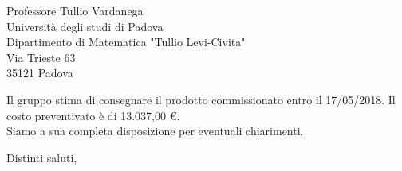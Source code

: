 \documentclass[12pt]{letter} %
\begin{document}
\begin{letter}{Professore Tullio Vardanega \\ Università degli studi di Padova \\ Dipartimento di Matematica "Tullio Levi-Civita" \\ Via Trieste 63 \\ 35121 Padova}
\begin{addmargin}[2em]{2em}
  Il gruppo stima di consegnare il prodotto commissionato entro il 17/05/2018. Il costo preventivato è di 13.037,00 \euro. \\ Siamo a sua completa disposizione per eventuali chiarimenti.
\end{addmargin}

\closing{Distinti saluti,}




\end{letter}
 
\end{document}
